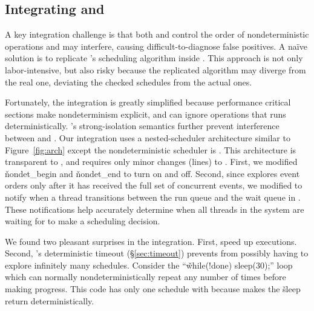 


\subsection{Integrating \parrot and \dbug} \label{sec:smt+mc}

A key integration challenge is that both \parrot and \dbug control the order
of nondeterministic operations and may interfere, causing
difficult-to-diagnose false positives.  A na\"{i}ve solution
is to replicate \parrot's scheduling algorithm inside \dbug.  This
approach is not only labor-intensive, but also risky because the
replicated algorithm may diverge from the real one, deviating the checked
schedules from the actual ones.

Fortunately, the integration is greatly simplified because performance
critical sections make nondeterminism explicit, and \dbug can ignore
operations that \parrot runs deterministically.  \parrot's strong-isolation
semantics further prevent interference
between \parrot and \dbug.  Our integration uses a nested-scheduler
architecture similar to Figure~\ref{fig:arch} except the
nondeterministic scheduler is \dbug.  This architecture is transparent
to \dbug, and requires only minor changes (\locsmcmc lines) to \parrot.
First, we modified \v{nondet\_begin} and \v{nondet\_end} to turn \dbug
on and off.  Second, since \dbug explores event orders only after
it has received the full set of concurrent events, we modified
\parrot to notify \dbug when a thread transitions between the run queue
and the wait queue in \parrot. These notifications help \dbug accurately
determine when all threads in the system are waiting for \dbug to make
a scheduling decision.

We found two pleasant surprises in the
integration.  First, \computes speed up \dbug executions.  Second,
\parrot's deterministic timeout (\S\ref{sec:timeout}) prevents \dbug from
possibly having to explore infinitely many schedules.  Consider the
``\v{while(!done) sleep(30);}'' loop which can normally
nondeterministically repeat any number of times before making
progress.  This code has only one schedule with \ecosys because \parrot
makes the \v{sleep} return deterministically.

